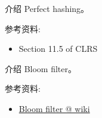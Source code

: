 \documentclass[a4paper, justified]{tufte-handout}
\begin{document}
\begin{solution}
\end{solution}

\beginoptional

\begin{problem}[TC 11.2-6]
\end{problem}

\begin{solution}
\end{solution}

\beginot

\begin{ot}
  介绍 Perfect hashing。

  \noindent 参考资料:
  \begin{itemize}
    \item Section 11.5 of CLRS
  \end{itemize}
\end{ot}

\begin{ot}
  介绍 Bloom filter。

  \noindent 参考资料:
  \begin{itemize}
    \item \href{https://en.wikipedia.org/wiki/Bloom\_filter}{Bloom filter @ wiki}
  \end{itemize}
\end{ot}




\beginfb

% 
% 
\end{document}
